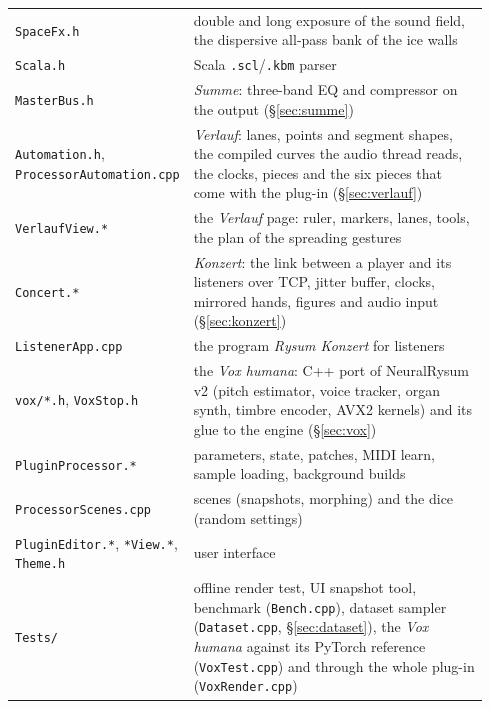 \documentclass[11pt,a4paper,parskip=half,DIV=11,toc=bibliography]{scrartcl}
\newcommand{\ui}[1]{\emph{#1}}                 %
\newcommand{\code}[1]{\texttt{#1}}
\newcommand{\fn}[1]{\mbox{\texttt{#1}}}
\begin{document}
{\begin{longtable}{@{}p{0.3\linewidth}p{0.64\linewidth}@{}}
\fn{SpaceFx.h}        & double and long exposure of the sound field, the dispersive all-pass bank of the ice walls \\
\fn{Scala.h}           & Scala \code{.scl}/\code{.kbm} parser \\
\fn{MasterBus.h}       & \ui{Summe}: three-band EQ and compressor on the output (\S\ref{sec:summe}) \\
\fn{Automation.h}, \fn{ProcessorAutomation.cpp} & \ui{Verlauf}: lanes, points and segment shapes, the compiled curves the audio thread reads, the clocks, pieces and the six pieces that come with the plug-in (\S\ref{sec:verlauf}) \\
\fn{VerlaufView.*}     & the \ui{Verlauf} page: ruler, markers, lanes, tools, the plan of the spreading gestures \\
\fn{Concert.*}         & \ui{Konzert}: the link between a player and its listeners over TCP, jitter buffer, clocks, mirrored hands, figures and audio input (\S\ref{sec:konzert}) \\
\fn{ListenerApp.cpp}   & the program \emph{Rysum Konzert} for listeners \\
\fn{vox/*.h}, \fn{VoxStop.h} & the \ui{Vox humana}: C++ port of NeuralRysum v2 (pitch estimator, voice tracker, organ synth, timbre encoder, AVX2 kernels) and its glue to the engine (\S\ref{sec:vox}) \\
\fn{PluginProcessor.*} & parameters, state, patches, MIDI learn, sample loading, background builds \\
\fn{ProcessorScenes.cpp} & scenes (snapshots, morphing) and the dice (random settings) \\
\fn{PluginEditor.*}, \fn{*View.*}, \fn{Theme.h} & user interface \\
\fn{Tests/}            & offline render test, UI snapshot tool, benchmark (\fn{Bench.cpp}), dataset sampler (\fn{Dataset.cpp}, \S\ref{sec:dataset}), the \ui{Vox humana} against its PyTorch reference (\fn{VoxTest.cpp}) and through the whole plug-in (\fn{VoxRender.cpp}) \\
\bottomrule
\end{longtable}
}
\end{document}
